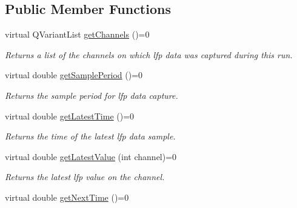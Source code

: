 \subsection*{Public Member Functions}
\begin{DoxyCompactItemize}
\item 
\hypertarget{class_picto_1_1_lfp_reader_a02cf01493217f514a1292344038a3d71}{virtual Q\-Variant\-List \hyperlink{class_picto_1_1_lfp_reader_a02cf01493217f514a1292344038a3d71}{get\-Channels} ()=0}\label{class_picto_1_1_lfp_reader_a02cf01493217f514a1292344038a3d71}

\begin{DoxyCompactList}\small\item\em Returns a list of the channels on which lfp data was captured during this run. \end{DoxyCompactList}\item 
\hypertarget{class_picto_1_1_lfp_reader_ae5a035867a2ea471473a56c727f8b3a3}{virtual double \hyperlink{class_picto_1_1_lfp_reader_ae5a035867a2ea471473a56c727f8b3a3}{get\-Sample\-Period} ()=0}\label{class_picto_1_1_lfp_reader_ae5a035867a2ea471473a56c727f8b3a3}

\begin{DoxyCompactList}\small\item\em Returns the sample period for lfp data capture. \end{DoxyCompactList}\item 
\hypertarget{class_picto_1_1_lfp_reader_a5add0f6135d93942aa830af19620943a}{virtual double \hyperlink{class_picto_1_1_lfp_reader_a5add0f6135d93942aa830af19620943a}{get\-Latest\-Time} ()=0}\label{class_picto_1_1_lfp_reader_a5add0f6135d93942aa830af19620943a}

\begin{DoxyCompactList}\small\item\em Returns the time of the latest lfp data sample. \end{DoxyCompactList}\item 
\hypertarget{class_picto_1_1_lfp_reader_aa42fd5f31b405122e76a81dcdc38efab}{virtual double \hyperlink{class_picto_1_1_lfp_reader_aa42fd5f31b405122e76a81dcdc38efab}{get\-Latest\-Value} (int channel)=0}\label{class_picto_1_1_lfp_reader_aa42fd5f31b405122e76a81dcdc38efab}

\begin{DoxyCompactList}\small\item\em Returns the latest lfp value on the channel. \end{DoxyCompactList}\item 
\hypertarget{class_picto_1_1_lfp_reader_a0566080962ad484da9e19ebac7514dfc}{virtual double \hyperlink{class_picto_1_1_lfp_reader_a0566080962ad484da9e19ebac7514dfc}{get\-Next\-Time} ()=0}\label{class_picto_1_1_lfp_reader_a0566080962ad484da9e19ebac7514dfc}


\end{DoxyCompactItemize}
